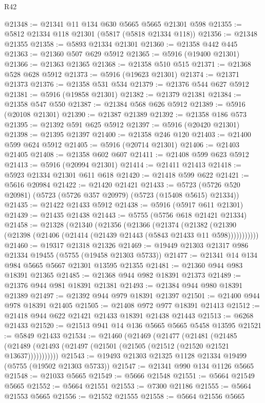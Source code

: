 \begin{lexlean}{R42}
\begin{coremodule}
@21348 := @21341 @11 @134 @630 @5665 @5665 @21301 @598
@21355 := @5812 @21334 @118 @21301 (@5817 (@5818 @21334 @118))
@21356 := @21348 @21355
@21358 := @5893 @21334 @21301
@21360 := @21358 @442 @445
@21363 := @21360 @507 @629 @5912
@21365 := @5916 (@19400 @21301)
@21366 := @21363 @21365
@21368 := @21358 @510 @515
@21371 := @21368 @528 @628 @5912
@21373 := @5916 (@19623 @21301)
@21374 := @21371 @21373
@21376 := @21358 @531 @534
@21379 := @21376 @544 @627 @5912
@21381 := @5916 (@19858 @21301)
@21382 := @21379 @21381
@21384 := @21358 @547 @550
@21387 := @21384 @568 @626 @5912
@21389 := @5916 (@20108 @21301)
@21390 := @21387 @21389
@21392 := @21358 @186 @573
@21395 := @21392 @591 @625 @5912
@21397 := @5916 (@20420 @21301)
@21398 := @21395 @21397
@21400 := @21358 @246 @120
@21403 := @21400 @599 @624 @5912
@21405 := @5916 (@20714 @21301)
@21406 := @21403 @21405
@21408 := @21358 @602 @607
@21411 := @21408 @599 @623 @5912
@21413 := @5916 (@20994 @21301)
@21414 := @21411 @21413
@21418 := @5923 @21334 @21301 @611 @618
@21420 := @21418 @599 @622
@21421 := @5616 @20984
@21422 := @21420 @21421
@21433 := @5723 (@5726 @520 @20981) (@5723 (@5726 @357 @20979) (@5723 (@15408 @5615) @21334))
@21435 := @21422 @21433 @5912
@21438 := @5916 (@5917 @611 @21301)
@21439 := @21435 @21438
@21443 := @5755 (@5756 @618 @21421 @21334)
@21458 := @21328
    (@21340
      (@21356
        (@21366
          (@21374
            (@21382 (@21390 (@21398 (@21406 (@21414 (@21439 @21443 (@5843 @21433 @11 @598)))))))))))
@21460 := @19317 @21318 @21326
@21469 := @19449 @21303 @21317 @986 @21334 @19455 (@5755 (@19458 @21303 @5733))
@21477 := @21341 @14 @134 @984 @5665 @5667 @21301 @13595 @21355
@21481 := @21360 @944 @983 @18391 @21365
@21485 := @21368 @944 @982 @18391 @21373
@21489 := @21376 @944 @981 @18391 @21381
@21493 := @21384 @944 @980 @18391 @21389
@21497 := @21392 @944 @979 @18391 @21397
@21501 := @21400 @944 @978 @18391 @21405
@21505 := @21408 @972 @977 @18391 @21413
@21512 := @21418 @944 @622 @21421 @21433 @18391 @21438 @21443
@21513 := @6268 @21433
@21520 := @21513 @941 @14 @136 @5665 @5665 @5458 @13595
@21521 := @5849 @21433
@21534 := @21460
    (@21469
      (@21477
        (@21481
          (@21485 (@21489 (@21493 (@21497 (@21501 (@21505 (@21512 (@21520 @21521 @13637)))))))))))
@21543 := @19493 @21303 @21325 @1128 @21334 @19499 (@5755 (@19502 @21303 @5733))
@21547 := @21341 @990 @134 @1126 @5665
@21548 := @21033 @5665
@21549 := @5666 @21548
@21551 := @5664 @21549 @5665
@21552 := @5664 @21551
@21553 := @7300 @21186
@21555 := @5664 @21553 @5665
@21556 := @21552 @21555
@21558 := @5664 @21556 @5665

\end{coremodule}
\end{lexlean}
